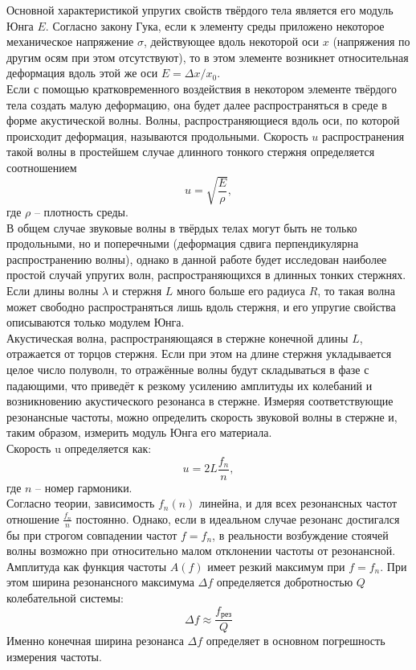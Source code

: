 \documentclass[a4paper]{article}
\begin{document}
Основной характеристикой упругих свойств твёрдого тела является его модуль Юнга $E$. Согласно закону Гука, если к элементу среды приложено некоторое механическое напряжение $\sigma$, действующее вдоль некоторой оси $x$ (напряжения по другим осям при этом отсутствуют), то в этом элементе возникнет относительная деформация вдоль этой же оси $E = \Delta x/x_0$. \vspace{0.2 cm} \\
Если с помощью кратковременного воздействия в некотором элементе твёрдого тела создать малую деформацию, она будет далее распространяться в среде в форме акустической волны. Волны, распространяющиеся вдоль оси, по которой происходит деформация, называются продольными. Скорость $u$ распространения такой волны в простейшем случае длинного тонкого стержня определяется соотношением
\begin{equation}
u = \sqrt{\frac{E}{\rho}},
\end{equation}
где $\rho$ -- плотность среды.  \vspace{0.2 cm} \\
В общем случае звуковые волны в твёрдых телах могут быть не только продольными, но и поперечными (деформация сдвига перпендикулярна распространению волны), однако в данной работе будет исследован наиболее простой случай упругих волн, распространяющихся в длинных тонких стержнях. Если длины волны $\lambda$ и стержня $L$ много больше его радиуса $R$, то такая волна может свободно распространяться лишь вдоль стержня, и его упругие свойства описываются только модулем Юнга. \vspace{0.2 cm} \\ 
Акустическая волна, распространяющаяся в стержне конечной длины $L$, отражается от торцов стержня. Если при этом на длине стержня укладывается целое число полуволн, то отражённые волны будут складываться в фазе с падающими, что приведёт к резкому усилению амплитуды их колебаний и возникновению акустического резонанса в стержне. Измеряя соответствующие резонансные частоты, можно определить скорость звуковой волны в стержне и, таким образом, измерить модуль Юнга его материала. \vspace{-0.2 cm} \\
Скорость u определяется как:
\begin{equation}
u = 2L\frac{f_n}{n},
\end{equation} 
где $n$ -- номер гармоники. \vspace{0.2 cm} \\
Согласно теории, зависимость $f_n(n)$ линейна, и для всех резонансных частот отношение $\frac{f_n}{n}$ постоянно. Однако, если в идеальном случае резонанс достигался бы при строгом совпадении частот $f = f_n$, в реальности возбуждение стоячей волны возможно при относительно малом отклонении частоты от резонансной. Амплитуда как функция частоты $A(f)$ имеет резкий максимум при $f = f_n$. При этом ширина резонансного максимума $\Delta f$ определяется добротностью $Q$ колебательной системы:
\begin{equation}
\Delta f \approx \frac{f_\text{рез}}{Q}
\end{equation}
Именно конечная ширина резонанса $\Delta f$ определяет в основном погрешность измерения частоты.
\end{document}
